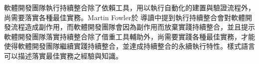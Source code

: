\documentclass[10pt, twocolumn]{article}
\begin{document}
軟體開發團隊執行持續整合除了依賴工具，用以執行自動化的建置與驗證流程外，尚需要落實各種最佳實務。Martin Fowler於\cite{continuousintegration2007} \textendash\hspace{3pt}導讀中提到執行持續整合會對軟體開發流程造成副作用，而軟體開發團隊會因為副作用而放棄實踐持續整合，並且提示軟體開發團隊落實持續整合除了借重工具輔助外，尚需要實踐各種最佳實務，才能使得軟體開發團隊繼續實踐持續整合，並達成持續整合的永續執行特性。樣式語言可以描述落實最佳實務之經驗與知識。





 
\end{document}

